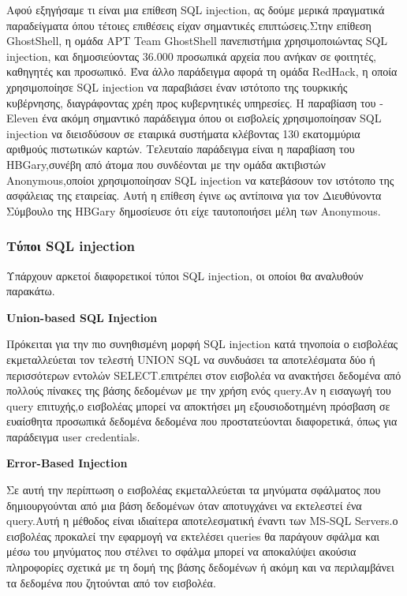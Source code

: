Αφού εξηγήσαμε τι είναι μια επίθεση SQL injection, ας δούμε μερικά πραγματικά παραδείγματα όπου τέτοιες επιθέσεις είχαν σημαντικές επιπτώσεις.Στην επίθεση \lt GhostShell\gt, η ομάδα \lt APT Team GhostShell  πανεπιστήμια χρησιμοποιώντας \lt SQL injection,  και δημοσιεύοντας 36.000 προσωπικά αρχεία που ανήκαν σε φοιτητές, καθηγητές και προσωπικό. Ένα άλλο παράδειγμα αφορά τη ομάδα \lt RedHack\gt, η οποία χρησιμοποίησε \lt SQL injection  να παραβιάσει έναν ιστότοπο της τουρκικής κυβέρνησης, διαγράφοντας χρέη προς κυβερνητικές υπηρεσίες. Η παραβίαση του -Eleven  ένα ακόμη σημαντικό παράδειγμα όπου οι εισβολείς χρησιμοποίησαν \lt SQL injection  να διεισδύσουν σε εταιρικά συστήματα κλέβοντας 130 εκατομμύρια αριθμούς πιστωτικών καρτών. Τελευταίο παράδειγμα είναι η παραβίαση του \lt HBGary, συνέβη από άτομα  που συνδέονται με την ομάδα ακτιβιστών \lt Anonymous, οποίοι χρησιμοποίησαν \lt SQL injection  να κατεβάσουν τον ιστότοπο της  ασφάλειας της εταιρείας. Αυτή η επίθεση έγινε ως αντίποινα για τον Διευθύνοντα Σύμβουλο της \lt HBGary  δημοσίευσε ότι είχε ταυτοποιήσει μέλη των \lt Anonymous.\gt


\subsubsection{Τύποι \lt SQL injection}
\hspace*{1em}Υπάρχουν αρκετοί διαφορετικοί τύποι \lt SQL injection\gt, οι οποίοι θα αναλυθούν παρακάτω.
\begin{center}
    \textbf{\lt Union-based SQL Injection}
\end{center}

Πρόκειται για την πιο συνηθισμένη μορφή \lt SQL injection \gt κατά τηνοποία ο εισβολέας εκμεταλλεύεται τον τελεστή \lt UNION  \lt SQL  να συνδυάσει τα αποτελέσματα δύο ή περισσότερων εντολών \lt SELECT. επιτρέπει στον εισβολέα να ανακτήσει δεδομένα από πολλούς πίνακες της βάσης δεδομένων με την χρήση ενός \lt query\gt.Αν η εισαγωγή του \lt query  επιτυχής,ο εισβολέας μπορεί να αποκτήσει μη εξουσιοδοτημένη πρόσβαση σε ευαίσθητα προσωπικά δεδομένα δεδομένα που προστατεύονται διαφορετικά, όπως για παράδειγμα \lt user credentials\gt.

\begin{center}
    \textbf{\lt Error-Based Injection}
\end{center}

Σε αυτή την περίπτωση ο εισβολέας εκμεταλλεύεται τα μηνύματα σφάλματος που δημιουργούνται από μια βάση δεδομένων όταν αποτυγχάνει να εκτελεστεί ένα \lt query\gt.Αυτή η μέθοδος είναι ιδιαίτερα αποτελεσματική έναντι των \lt MS-SQL Servers. ο εισβολέας προκαλεί την εφαρμογή να εκτελέσει \lt queries  θα παράγουν σφάλμα και μέσω του μηνύματος που στέλνει το σφάλμα μπορεί να αποκαλύψει ακούσια πληροφορίες σχετικά με τη δομή της βάσης δεδομένων ή ακόμη και να περιλαμβάνει τα δεδομένα που ζητούνται από τον εισβολέα.

